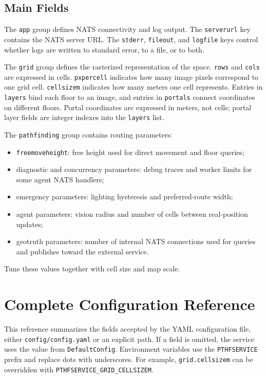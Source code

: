 \documentclass[12pt,a4paper]{report}
\begin{document}
\subsection{Main Fields}

The \texttt{app} group defines NATS connectivity and log output. The
\texttt{serverurl} key contains the NATS server URL. The \texttt{stderr},
\texttt{fileout}, and \texttt{logfile} keys control whether logs are written to
standard error, to a file, or to both.

The \texttt{grid} group defines the rasterized representation of the space.
\texttt{rows} and \texttt{cols} are expressed in cells. \texttt{pxpercell}
indicates how many image pixels correspond to one grid cell.
\texttt{cellsizem} indicates how many meters one cell represents. Entries in
\texttt{layers} bind each floor to an image, and entries in \texttt{portals}
connect coordinates on different floors. Portal coordinates are expressed in
meters, not cells; portal layer fields are integer indexes into the
\texttt{layers} list.

The \texttt{pathfinding} group contains routing parameters:

\begin{itemize}
\item \texttt{freemoveheight}: free height used for direct movement and floor
queries;
\item diagnostic and concurrency parameters: debug traces and worker limits for
some agent NATS handlers;
\item emergency parameters: lighting hysteresis and preferred-route width;
\item agent parameters: vision radius and number of cells between real-position
updates;
\item geotruth parameters: number of internal NATS connections used for queries
and publishes toward the external service.
\end{itemize}

Tune these values together with cell size and map scale.

\section{Complete Configuration Reference}

This reference summarizes the fields accepted by the YAML configuration file,
either \texttt{config/config.yaml} or an explicit path. If a field is omitted,
the service uses the value from \texttt{DefaultConfig}. Environment variables
use the \texttt{PTHFSERVICE} prefix and replace dots with underscores. For
example, \texttt{grid.cellsizem} can be overridden with
\texttt{PTHFSERVICE\_GRID\_CELLSIZEM}.
\end{document}
